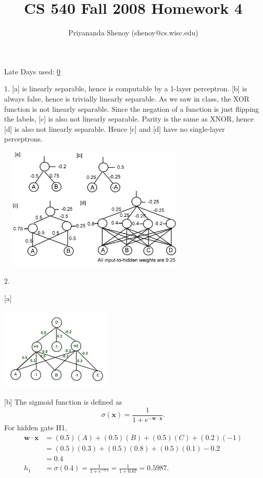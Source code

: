 \documentclass[11pt]{article}
\author{Priyananda Shenoy (shenoy@cs.wisc.edu)}
\title{	CS 540 Fall 2008 Homework 4}
\newcommand{\vc}[1]{\mathbf{#1}}
\newcommand{\dotp}[2]{\vc{#1} \cdot \vc{#2}}
\begin{document}
\maketitle
\begin{center}
	Late Days used: \underline{0}
\end{center}

\newpage

1. [a] is linearly separable, hence is computable by a 1-layer perceptron.
[b] is always false, hence is trivially linearly separable. As we saw in class,
the XOR function is not linearly separable. Since the negation of a function is
just flipping the labels, [c] is also not linearly separable. Parity is the
same as XNOR, hence [d] is also not linearly separable. Hence [c] and [d] have
no single-layer perceptrons.

\begin{center} \includegraphics[width=350px,height=225px]{1.png} \end{center}

2. 

[a] \begin{center} \includegraphics[width=200px,height=150px]{2.png} \end{center}

[b] The sigmoid function is defined as
\[ \sigma(\vc{x}) = \frac{1}{1 + e^{-\dotp{w}{x}}}. \]
For hidden gate H1,
\begin{align*}
	\dotp{w}{x} &= (0.5)(A) + (0.5)(B) + (0.5)(C) + (0.2)(-1) \\
		&= (0.5)(0.3) + (0.5)(0.8) + (0.5)(0.1) - 0.2 \\
		&= 0.4 \\
	h_1 &= \sigma(0.4) = \frac{1}{1 + e^{-0.4}} = \frac{1}{1 + 0.67} = 0.5987.
\end{align*}
\end{document}
